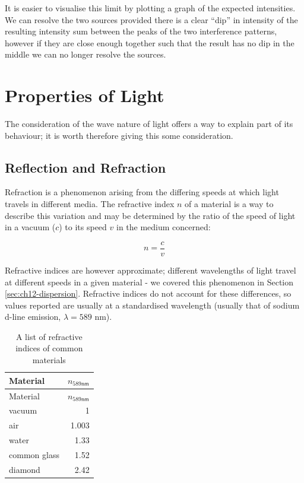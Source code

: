 \documentclass[
]{book}
\begin{document}
It is easier to visualise this limit by plotting a graph of the expected intensities. We can resolve the two sources provided there is a clear ``dip'' in intensity of the resulting intensity sum between the peaks of the two interference patterns, however if they are close enough together such that the result has no dip in the middle we can no longer resolve the sources.

\hypertarget{sec:ch14-propertieslight}{%
\chapter{Properties of Light}\label{sec:ch14-propertieslight}}

The consideration of the wave nature of light offers a way to explain part of its behaviour; it is worth therefore giving this some consideration.

\hypertarget{sec:ch14-reflectionrefraction}{%
\section{Reflection and Refraction}\label{sec:ch14-reflectionrefraction}}

Refraction is a phenomenon arising from the differing speeds at which light travels in different media. The refractive index \(n\) of a material is a way to describe this variation and may be determined by the ratio of the speed of light in a vacuum (\(c\)) to its speed \(v\) in the medium concerned:

\begin{equation}
n = \frac{c}{v}
\end{equation}

Refractive indices are however approximate; different wavelengths of light travel at different speeds in a given material - we covered this phenomenon in Section \ref{sec:ch12-dispersion}. Refractive indices do not account for these differences, so values reported are usually at a standardised wavelength (usually that of sodium d-line emission, \(\lambda = 589\) nm).

\begin{longtable}[]{@{}lr@{}}
\caption{\label{tab:ch14-refractiveindices} A list of refractive indices of common materials}\tabularnewline
\toprule
Material & \(n_{589 \textsf{nm}}\)\tabularnewline
\midrule
\endfirsthead
\toprule
Material & \(n_{589 \textsf{nm}}\)\tabularnewline
\midrule
\endhead
vacuum & 1\tabularnewline
air & 1.003\tabularnewline
water & 1.33\tabularnewline
common glass & 1.52\tabularnewline
diamond & 2.42\tabularnewline
\bottomrule
\end{longtable}
\end{document}
